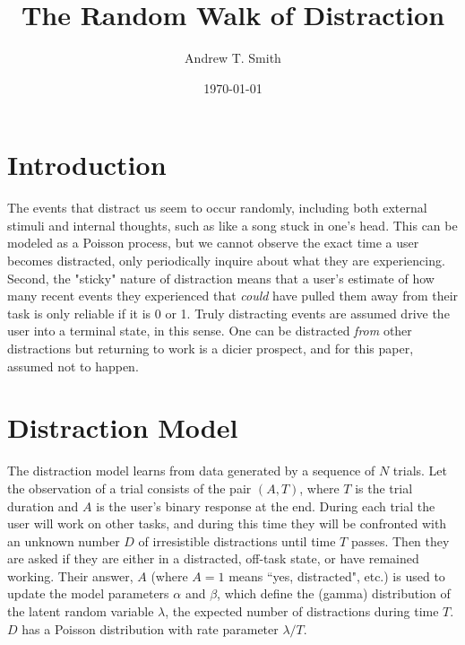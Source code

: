 \documentclass{article}
\begin{document}
\title{The Random Walk of Distraction}
\author{Andrew T. Smith}
\date{\today}
\maketitle

\section{Introduction}
The events that distract us seem to occur randomly, including both external stimuli and internal thoughts, such as like a song stuck in one's head.   This can be modeled as a Poisson process, but we cannot observe the exact time a user becomes distracted, only periodically inquire about what they are experiencing.  Second, the "sticky" nature of distraction means that a user's estimate of how many recent events they experienced that \emph{could} have pulled them away from their task is only reliable if it is 0 or 1.  Truly distracting events are assumed drive the user into a terminal state, in this sense. One can be distracted \emph{from} other distractions but returning to work is a dicier prospect, and for this paper, assumed not to happen.

\section{Distraction Model}
The distraction model learns from data generated by a sequence of $N$ trials.  Let the observation of a trial consists of the pair $(A, T)$, where $T$ is the trial duration and $A$ is the user's binary response at the end.  During each trial the user will work on other tasks, and during this time they will be confronted with an unknown number $D$ of irresistible distractions until time $T$ passes. Then they are asked if they are either in a distracted, off-task state, or have remained working.  Their answer, $A$ (where $A=1$ means ``yes, distracted", etc.) is used to update the model parameters $\alpha$ and $\beta$, which define the (gamma) distribution of the latent random variable  $\lambda$, the expected number of distractions during time $T$.  $D$ has a Poisson distribution with rate parameter $\lambda/T$.
\renewcommand{\arraystretch}{1.2}
\newcommand{\poisson}{{\rm Pr}}
\newcommand{\exponential}{{\rm Exp}}
\bigskip
\end{document}
